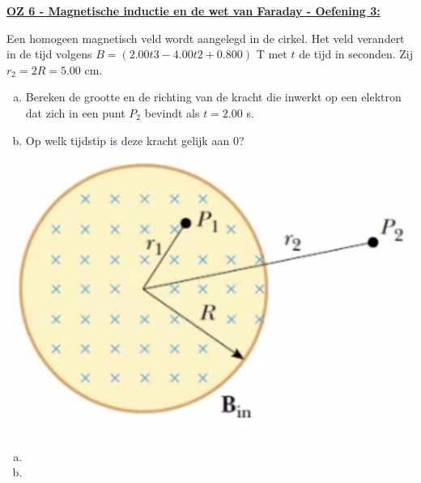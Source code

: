 \textbf{\underline{OZ 6 - Magnetische inductie en de wet van Faraday - Oefening 3:}}
\vspace{0.5cm}

    \begin{minipage}{.76\textwidth}
        Een homogeen magnetisch veld wordt aangelegd in de cirkel. Het veld verandert in de tijd volgens $B = (2.00t3 - 4.00t2 +0.800) $ T met $t$ de tijd in seconden. Zij $r_2 = 2R = 5.00$ cm.

        \begin{enumerate}[(a)]
            \item Bereken de grootte en de richting van de kracht die inwerkt op een elektron dat zich in een punt $P_2$ bevindt als $t = 2.00$ s.
            \item Op welk tijdstip is deze kracht gelijk aan $0$?
        \end{enumerate}    
    \end{minipage}
    \hspace{0.5cm}\begin{minipage}{.2\textwidth}
        \includegraphics[scale = 0.22]{oz06/resources/Oz6Oef3.png}
    \end{minipage}

    \begin{enumerate}[(a)]
        \item     
            \begin{description}[labelwidth=1.5cm, leftmargin=!]
                \item[Geg. :]
                \item[Gevr. :] 
                \item[Opl. :]
            \end{description}
        \item     
            \begin{description}[labelwidth=1.5cm, leftmargin=!]
                \item[Geg. :]
                \item[Gevr. :] 
                \item[Opl. :]
            \end{description}
    \end{enumerate}



\vspace{1cm}